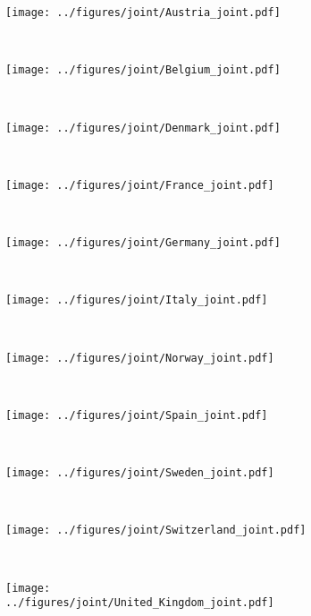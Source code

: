 \documentclass[12pt]{extarticle}
\begin{document}
\begin{figure}[p]	
    \centering
    \begin{subfigure}{0.32\textwidth}
        \texttt{[image: ../figures/joint/Austria\_joint.pdf]}
    \end{subfigure}
    ~%
    \begin{subfigure}{0.32\textwidth}
        \texttt{[image: ../figures/joint/Belgium\_joint.pdf]}
    \end{subfigure}
    ~%
    \begin{subfigure}{0.32\textwidth}
        \texttt{[image: ../figures/joint/Denmark\_joint.pdf]}
    \end{subfigure}
	~%
    \begin{subfigure}{0.32\textwidth}
        \texttt{[image: ../figures/joint/France\_joint.pdf]}
    \end{subfigure}
    ~%
    \begin{subfigure}{0.32\textwidth}
        \texttt{[image: ../figures/joint/Germany\_joint.pdf]}
    \end{subfigure}
    ~%
    \begin{subfigure}{0.32\textwidth}
        \texttt{[image: ../figures/joint/Italy\_joint.pdf]}
    \end{subfigure}
    ~%
	\begin{subfigure}{0.32\textwidth}
        \texttt{[image: ../figures/joint/Norway\_joint.pdf]}
    \end{subfigure}
    ~%
	\begin{subfigure}{0.32\textwidth}
        \texttt{[image: ../figures/joint/Spain\_joint.pdf]}
    \end{subfigure}
    ~%
	\begin{subfigure}{0.32\textwidth}
        \texttt{[image: ../figures/joint/Sweden\_joint.pdf]}
    \end{subfigure}
    ~%
	\begin{subfigure}{0.32\textwidth}
        \texttt{[image: ../figures/joint/Switzerland\_joint.pdf]}
    \end{subfigure}
    ~%
	\begin{subfigure}{0.32\textwidth}
        \texttt{[image: ../figures/joint/United\_Kingdom\_joint.pdf]}
    \end{subfigure}
    ~%
	\begin{subfigure}{0.32\textwidth}

\end{subfigure}
\end{figure}
\end{document}
